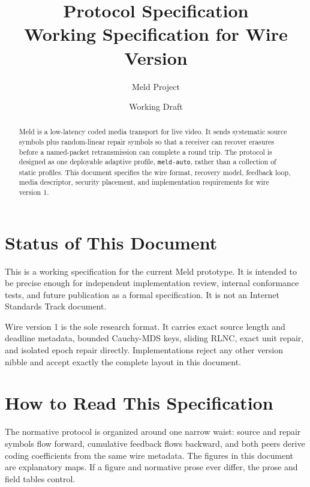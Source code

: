 \documentclass[11pt]{article}
\title{\meld{} Protocol Specification\\
\large Working Specification for Wire Version \wireversion}
\author{Meld Project}
\date{Working Draft}
\newcommand{\meld}{Meld}
\newcommand{\wireversion}{1}
\newcommand{\code}[1]{\ifmmode\text{\texttt{#1}}\else\texttt{#1}\fi}
\begin{document}
\maketitle

\begin{abstract}
\meld{} is a low-latency coded media transport for live video. It sends
systematic source symbols plus random-linear repair symbols so that a receiver can
recover erasures before a named-packet retransmission can complete a round trip.
The protocol is designed as one deployable adaptive profile, \code{meld-auto},
rather than a collection of static profiles. This document specifies the wire
format, recovery model, feedback loop, media descriptor, security placement, and
implementation requirements for wire version \wireversion.
\end{abstract}

\tableofcontents
\clearpage
{}
{}
\renewcommand{\listfigurename}{Visual Index}
\listoffigures
\clearpage

\section*{Status of This Document}
{}

This is a working specification for the current Meld prototype. It is intended to
be precise enough for independent implementation review, internal conformance
tests, and future publication as a formal specification. It is not an Internet
Standards Track document.

Wire version \wireversion{} is the sole research format. It carries exact source
length and deadline metadata, bounded Cauchy-MDS keys, sliding RLNC, exact unit
repair, and isolated epoch repair directly. Implementations reject any other
version nibble and accept exactly the complete layout in this document.

\section*{How to Read This Specification}
\label{sec:reading-guide}
{}

The normative protocol is organized around one narrow waist: source and repair
symbols flow forward, cumulative feedback flows backward, and both peers derive
coding coefficients from the same wire metadata. The figures in this document
are explanatory maps. If a figure and normative prose ever differ, the prose and
field tables control.
\end{document}
